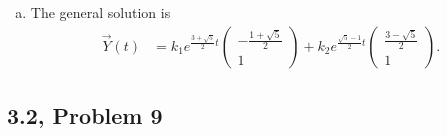 \documentclass[10pt]{mypackage}
\begin{document}
\begin{enumerate}[(a)]
\begin{center}
    \end{center}
  \item The general solution is
    \begin{align*}
      \vec{Y}(t) &= k_1 e^{\frac{3+\sqrt{5}}{2} t} \begin{pmatrix}-\frac{1+\sqrt{5}}{2}\\1\end{pmatrix} + k_2e^{\frac{\sqrt{5}-1}{2} t} \begin{pmatrix}\frac{3-\sqrt{5}}{2}\\1\end{pmatrix}.
    \end{align*}
\end{enumerate}
\subsection{3.2, Problem 9}%
\end{document}
